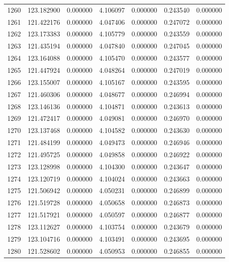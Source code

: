 \begin{tabular}{rrrrrrr}
1260 & 123.182900 &    0.000000 &  4.106097 &   0.000000 &   0.243540 &  0.000000 \\
1261 & 121.422176 &    0.000000 &  4.047406 &   0.000000 &   0.247072 &  0.000000 \\
1262 & 123.173383 &    0.000000 &  4.105779 &   0.000000 &   0.243559 &  0.000000 \\
1263 & 121.435194 &    0.000000 &  4.047840 &   0.000000 &   0.247045 &  0.000000 \\
1264 & 123.164088 &    0.000000 &  4.105470 &   0.000000 &   0.243577 &  0.000000 \\
1265 & 121.447924 &    0.000000 &  4.048264 &   0.000000 &   0.247019 &  0.000000 \\
1266 & 123.155007 &    0.000000 &  4.105167 &   0.000000 &   0.243595 &  0.000000 \\
1267 & 121.460306 &    0.000000 &  4.048677 &   0.000000 &   0.246994 &  0.000000 \\
1268 & 123.146136 &    0.000000 &  4.104871 &   0.000000 &   0.243613 &  0.000000 \\
1269 & 121.472417 &    0.000000 &  4.049081 &   0.000000 &   0.246970 &  0.000000 \\
1270 & 123.137468 &    0.000000 &  4.104582 &   0.000000 &   0.243630 &  0.000000 \\
1271 & 121.484199 &    0.000000 &  4.049473 &   0.000000 &   0.246946 &  0.000000 \\
1272 & 121.495725 &    0.000000 &  4.049858 &   0.000000 &   0.246922 &  0.000000 \\
1273 & 123.128998 &    0.000000 &  4.104300 &   0.000000 &   0.243647 &  0.000000 \\
1274 & 123.120719 &    0.000000 &  4.104024 &   0.000000 &   0.243663 &  0.000000 \\
1275 & 121.506942 &    0.000000 &  4.050231 &   0.000000 &   0.246899 &  0.000000 \\
1276 & 121.519728 &    0.000000 &  4.050658 &   0.000000 &   0.246873 &  0.000000 \\
1277 & 121.517921 &    0.000000 &  4.050597 &   0.000000 &   0.246877 &  0.000000 \\
1278 & 123.112627 &    0.000000 &  4.103754 &   0.000000 &   0.243679 &  0.000000 \\
1279 & 123.104716 &    0.000000 &  4.103491 &   0.000000 &   0.243695 &  0.000000 \\
1280 & 121.528602 &    0.000000 &  4.050953 &   0.000000 &   0.246855 &  0.000000 \\

\end{tabular}
